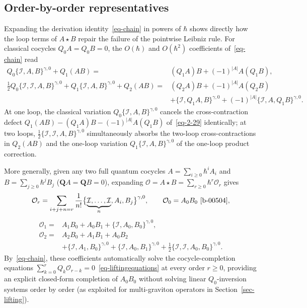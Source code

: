 \documentclass[11pt]{article}
\numberwithin{equation}{section}
\numberwithin{figure}{section}
\numberwithin{table}{section}
\begin{document}
\subsection{Order-by-order representatives}\label{sec-order-by-order}

Expanding the derivation identity~\eqref{eq-chain} in powers of $\hbar$ shows directly how the loop terms of $A\star B$ repair the failure of the pointwise Leibniz rule. For classical cocycles $Q_0A=Q_0B=0$, the $O(\hbar)$ and $O(\hbar^2)$ coefficients of~\eqref{eq-chain} read
\begin{equation}\label{eq-2-55}
\begin{aligned}
Q_0\{\mathcal I,A,B\}^{\gamma,0}+Q_1(AB)
={}&(Q_1A)B+(-1)^{|A|}A(Q_1B),\\[3pt]
\frac12Q_0\{\mathcal I,\mathcal I,A,B\}^{\gamma,0}
+Q_1\{\mathcal I,A,B\}^{\gamma,0}+Q_2(AB)
={}&(Q_2A)B+(-1)^{|A|}A(Q_2B)\\
&+\{\mathcal I,Q_1A,B\}^{\gamma,0}
+(-1)^{|A|}\{\mathcal I,A,Q_1B\}^{\gamma,0}.
\end{aligned}
\end{equation}
At one loop, the classical variation $Q_0\{\mathcal I,A,B\}^{\gamma,0}$ cancels the cross-contraction defect $Q_1(AB)-(Q_1A)B-(-1)^{|A|}A(Q_1B)$ of~\eqref{eq-2-29} identically; at two loops, $\frac12\{\mathcal I,\mathcal I,A,B\}^{\gamma,0}$ simultaneously absorbs the two-loop cross-contractions in $Q_2(AB)$ and the one-loop variation $Q_1\{\mathcal I,A,B\}^{\gamma,0}$ of the one-loop product correction.

More generally, given any two full quantum cocycles $A=\sum_{i\ge0}\hbar^iA_i$ and $B=\sum_{j\ge0}\hbar^jB_j$ ($\mathbf QA=\mathbf QB=0$), expanding $\mathcal O=A\star B=\sum_{r\ge0}\hbar^r\mathcal O_r$ gives
\begin{equation}\label{eq-2-32}
\mathcal O_r=\sum_{i+j+n=r}\frac1{n!}\bigl\{\underbrace{\mathcal I,\ldots,\mathcal I}_{n},A_i,B_j\bigr\}^{\gamma,0},\qquad\mathcal O_0=A_0B_0\ \text{\eqref{b-00504}},
\end{equation}
\begin{equation}\label{eq-2-33}
\begin{aligned}
\mathcal O_1={}&A_1B_0+A_0B_1
+{\{\mathcal I,A_0,B_0\}^{\gamma,0}},\\
\mathcal O_2={}&A_2B_0+A_1B_1+A_0B_2\\
&+\{\mathcal I,A_1,B_0\}^{\gamma,0}
+\{\mathcal I,A_0,B_1\}^{\gamma,0}
+{\frac12\{\mathcal I,\mathcal I,A_0,B_0\}^{\gamma,0}}.
\end{aligned}
\end{equation}
By~\eqref{eq-chain}, these coefficients automatically solve the cocycle-completion equations $\sum_{k=0}^rQ_k\mathcal O_{r-k}=0$~\eqref{eq-liftingequations} at every order $r\ge0$, providing an explicit closed-form completion of $A_0B_0$ without solving linear $Q_0$-inversion systems order by order (as exploited for multi-graviton operators in Section~\ref{sec-lifting}).
\end{document}
